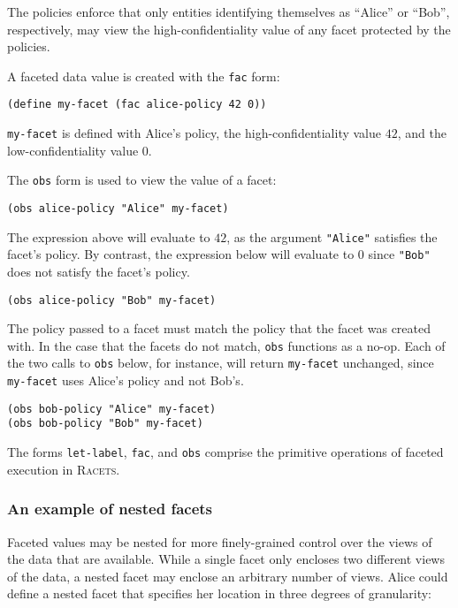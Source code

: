 \documentclass{article}
\begin{document}
The policies enforce that only entities identifying themselves as ``Alice'' or ``Bob'', respectively, may view the high-confidentiality value of any facet protected by the policies.

A faceted data value is created with the \texttt{fac} form:

\begin{lstlisting}
(define my-facet (fac alice-policy 42 0))
\end{lstlisting}

\texttt{my-facet} is defined with Alice's policy, the high-confidentiality value $42$, and the low-confidentiality value $0$.

The \texttt{obs} form is used to view the value of a facet:

\begin{lstlisting}
(obs alice-policy "Alice" my-facet)
\end{lstlisting}

The expression above will evaluate to $42$, as the argument \texttt{"Alice"} satisfies the facet's policy. By contrast, the expression below will evaluate to $0$ since \texttt{"Bob"} does not satisfy the facet's policy.

\begin{lstlisting}
(obs alice-policy "Bob" my-facet)
\end{lstlisting}

The policy passed to a facet must match the policy that the facet was created with. In the case that the facets do not match, \texttt{obs} functions as a no-op. Each of the two calls to \texttt{obs} below, for instance, will return \texttt{my-facet} unchanged, since \texttt{my-facet} uses Alice's policy and not Bob's.

\begin{lstlisting}
(obs bob-policy "Alice" my-facet)
(obs bob-policy "Bob" my-facet)
\end{lstlisting}

The forms \texttt{let-label}, \texttt{fac}, and \texttt{obs} comprise the primitive operations of faceted execution in \textsc{Racets}.


\subsubsection{An example of nested facets}
Faceted values may be nested for more finely-grained control over the views of the data that are available. While a single facet only encloses two different views of the data, a nested facet may enclose an arbitrary number of views. Alice could define a nested facet that specifies her location in three degrees of granularity:
\end{document}
